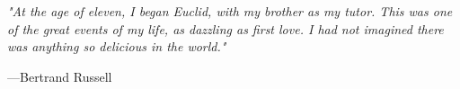     \vspace*{2cm}
    
    \begin{center}
        \Large{\parbox{10cm}{
            \begin{raggedright}
            {\Large 
                \textit{"At the age of eleven, I began Euclid, with my brother as my tutor. This was one of the great events of my life, as dazzling as first love. I had not imagined there was anything so delicious in the world."}
            }
        
            \vspace{.5cm}\hfill{---Bertrand Russell}
            \end{raggedright}
        }
    }
    \end{center}
    
  
    \newpage
    
 